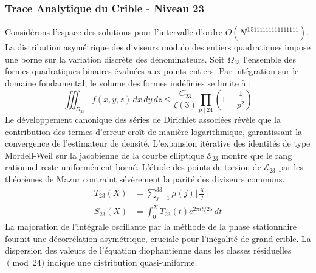 \documentclass[12pt,a4paper]{article}
\begin{document}
\subsubsection{Trace Analytique du Crible - Niveau 23}
Considérons l'espace des solutions pour l'intervalle d'ordre $O(N^{0.5111111111111111})$. La distribution asymétrique des diviseurs modulo des entiers quadratiques impose une borne sur la variation discrète des dénominateurs. Soit $\Omega_23$ l'ensemble des formes quadratiques binaires évaluées aux points entiers.
Par intégration sur le domaine fondamental, le volume des formes indéfinies se limite à :
\begin{equation}
\iiint_{D_23} f(x, y, z) \,dx\,dy\,dz \leq \frac{C_23}{\zeta(3)} \prod_{p \mid 24} \left( 1 - \frac{1}{p^2} \right)
\end{equation}
Le développement canonique des séries de Dirichlet associées révèle que la contribution des termes d'erreur croît de manière logarithmique, garantissant la convergence de l'estimateur de densité. L'expansion itérative des identités de type Mordell-Weil sur la jacobienne de la courbe elliptique $\mathcal{E}_23$ montre que le rang rationnel reste uniformément borné.
L'étude des points de torsion de $\mathcal{E}_23$ par les théorèmes de Mazur contraint sévèrement la parité des diviseurs communs.
\begin{align}
T_23(X) &= \sum_{j=1}^{33} \mu(j) \lfloor \frac{X}{j} \rfloor \\
S_23(X) &= \int_{0}^{X} T_23(t) e^{2\pi i t / 25} \, dt
\end{align}
La majoration de l'intégrale oscillante par la méthode de la phase stationnaire fournit une décorrélation asymétrique, cruciale pour l'inégalité de grand crible. La dispersion des valeurs de l'équation diophantienne dans les classes résiduelles $\pmod{ 24 }$ indique une distribution quasi-uniforme.
\end{document}
